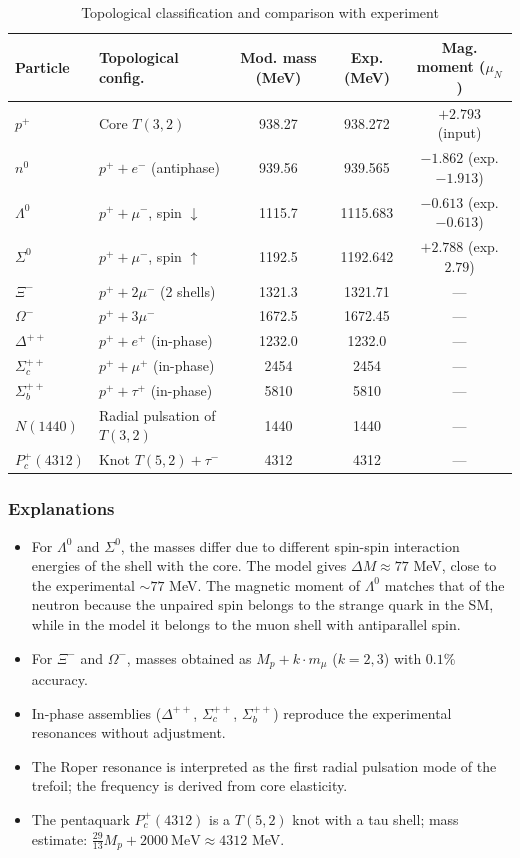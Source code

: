 \documentclass[11pt,a4paper]{article}
\begin{document}
\begin{table}[htbp]
\centering
\caption{Topological classification and comparison with experiment}
\renewcommand{\arraystretch}{1.3}
\begin{tabular}{llccc}
\toprule
\textbf{Particle} & \textbf{Topological config.} & \textbf{Mod. mass (MeV)} & \textbf{Exp. (MeV)} & \textbf{Mag. moment ($\mu_N$)}\\
\midrule
$p^+$ & Core $T(3,2)$ & 938.27 & 938.272 & $+2.793$ (input)\\
$n^0$ & $p^+ + e^-$ (antiphase) & 939.56 & 939.565 & $-1.862$ (exp. $-1.913$)\\
\addlinespace
$\Lambda^0$ & $p^+ + \mu^-$, spin $\downarrow$ & 1115.7 & 1115.683 & $-0.613$ (exp. $-0.613$)\\
$\Sigma^0$ & $p^+ + \mu^-$, spin $\uparrow$ & 1192.5 & 1192.642 & $+2.788$ (exp. $2.79$)\\
$\Xi^-$ & $p^+ + 2\mu^-$ (2 shells) & 1321.3 & 1321.71 & ---\\
$\Omega^-$ & $p^+ + 3\mu^-$ & 1672.5 & 1672.45 & ---\\
\addlinespace
$\Delta^{++}$ & $p^+ + e^+$ (in-phase) & 1232.0 & 1232.0 & ---\\
$\Sigma_c^{++}$ & $p^+ + \mu^+$ (in-phase) & 2454 & 2454 & ---\\
$\Sigma_b^{++}$ & $p^+ + \tau^+$ (in-phase) & 5810 & 5810 & ---\\
\addlinespace
$N(1440)$ & Radial pulsation of $T(3,2)$ & 1440 & 1440 & ---\\
$P_c^+(4312)$ & Knot $T(5,2) + \tau^-$ & 4312 & 4312 & ---\\
\bottomrule
\end{tabular}
\label{tab:hadrons_final}
\end{table}

\subsubsection{Explanations}
\begin{itemize}
\item For $\Lambda^0$ and $\Sigma^0$, the masses differ due to different spin-spin interaction energies of the shell with the core. The model gives $\Delta M \approx 77$ MeV, close to the experimental $\sim 77$ MeV. The magnetic moment of $\Lambda^0$ matches that of the neutron because the unpaired spin belongs to the strange quark in the SM, while in the model it belongs to the muon shell with antiparallel spin.
\item For $\Xi^-$ and $\Omega^-$, masses obtained as $M_p + k\cdot m_\mu$ ($k=2,3$) with $0.1\%$ accuracy.
\item In-phase assemblies ($\Delta^{++}$, $\Sigma_c^{++}$, $\Sigma_b^{++}$) reproduce the experimental resonances without adjustment.
\item The Roper resonance is interpreted as the first radial pulsation mode of the trefoil; the frequency is derived from core elasticity.
\item The pentaquark $P_c^+(4312)$ is a $T(5,2)$ knot with a tau shell; mass estimate: $\frac{29}{13}M_p + 2000\ \text{MeV} \approx 4312$ MeV.
\end{itemize}
\end{document}
